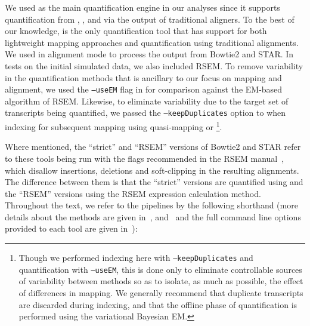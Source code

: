 We used \salmon as the main quantification engine in our analyses since it supports
quantification from \qm, \hsa, and via the output of traditional aligners. To
the best of our knowledge, \salmon is the only quantification tool
that has support for both lightweight mapping approaches and quantification
using traditional alignments. We used \salmon in alignment mode to process the
output from Bowtie2 and STAR. In tests on the initial simulated data, we also
included RSEM. To remove variability in the quantification methods that is
ancillary to our focus on mapping and alignment, we used the \texttt{--useEM}
flag in \salmon for comparison against the EM-based algorithm of RSEM. Likewise,
to eliminate variability due to the target set of transcripts being quantified,
we passed the \texttt{--keepDuplicates} option to \salmon when indexing for
subsequent mapping using quasi-mapping or \hsa\footnote{Though we performed
  indexing here with \texttt{--keepDuplicates} and quantification with
  \texttt{--useEM}, this is done only to eliminate controllable sources of
  variability between methods so as to isolate, as much as possible, the effect
  of differences in mapping. We generally recommend that duplicate transcripts
  are discarded during indexing, and that the offline phase of quantification is
  performed using the variational Bayesian EM.}.
  
Where mentioned, the ``strict'' and ``RSEM'' versions of Bowtie2 and STAR refer to these tools
being run with the flags recommended in the RSEM manual~\citep{rsem_manual},
which disallow insertions, deletions and soft-clipping in the resulting
alignments. The difference between them is that the ``strict'' versions are
quantified using \salmon and the ``RSEM'' versions using the RSEM expression
calculation method. Throughout the text, we refer to the pipelines by the
following shorthand (more details about the methods are given in~, and~ and
the full command line options provided to
each tool are given in~):

